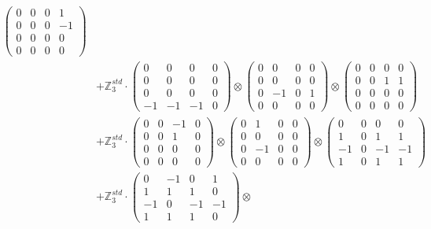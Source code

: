 \documentclass{article}
\begin{document}
{\begin{align}
            \begin{pmatrix} 0 & 0 & 0 & 1 \\ 0 & 0 & 0 & -1 \\ 0 & 0 & 0 & 0 \\ 0 & 0 & 0 & 0 \end{pmatrix} \\ 
        &+ \label{Rs16-Rc11-Solution-5-c25} \mathbb{Z}_3^{std} \cdot 
            \begin{pmatrix} 0 & 0 & 0 & 0 \\ 0 & 0 & 0 & 0 \\ 0 & 0 & 0 & 0 \\ -1 & -1 & -1 & 0 \end{pmatrix} \otimes 
            \begin{pmatrix} 0 & 0 & 0 & 0 \\ 0 & 0 & 0 & 0 \\ 0 & -1 & 0 & 1 \\ 0 & 0 & 0 & 0 \end{pmatrix} \otimes 
            \begin{pmatrix} 0 & 0 & 0 & 0 \\ 0 & 0 & 1 & 1 \\ 0 & 0 & 0 & 0 \\ 0 & 0 & 0 & 0 \end{pmatrix} \\ 
        &+ \label{Rs16-Rc11-Solution-5-c26} \mathbb{Z}_3^{std} \cdot 
            \begin{pmatrix} 0 & 0 & -1 & 0 \\ 0 & 0 & 1 & 0 \\ 0 & 0 & 0 & 0 \\ 0 & 0 & 0 & 0 \end{pmatrix} \otimes 
            \begin{pmatrix} 0 & 1 & 0 & 0 \\ 0 & 0 & 0 & 0 \\ 0 & -1 & 0 & 0 \\ 0 & 0 & 0 & 0 \end{pmatrix} \otimes 
            \begin{pmatrix} 0 & 0 & 0 & 0 \\ 1 & 0 & 1 & 1 \\ -1 & 0 & -1 & -1 \\ 1 & 0 & 1 & 1 \end{pmatrix} \\ 
        &+ \label{Rs16-Rc11-Solution-5-c27} \mathbb{Z}_3^{std} \cdot 
            \begin{pmatrix} 0 & -1 & 0 & 1 \\ 1 & 1 & 1 & 0 \\ -1 & 0 & -1 & -1 \\ 1 & 1 & 1 & 0 \end{pmatrix} \otimes 

\end{align}}
\end{document}
